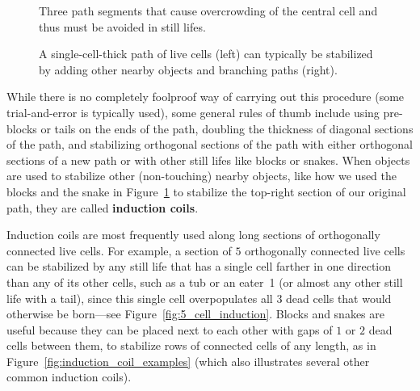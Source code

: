 \begin{figure}[!htb]
	\centering
	\begin{minipage}{.31\textwidth}
		\centering
		\caption{Three path segments that cause overcrowding of the central cell and thus must be avoided in still lifes.}
		\label{fig:invalid_path}
	\end{minipage} \quad %
	\begin{minipage}{.64\textwidth}
		\centering
		\caption{A single-cell-thick path of live cells (left) can typically be stabilized by adding other nearby objects and branching paths (right).}
		\label{fig:still_life_path}
	\end{minipage}
\end{figure}

While there is no completely foolproof way of carrying out this procedure (some trial-and-error is typically used), some general rules of thumb include using pre-blocks or tails on the ends of the path, doubling the thickness of diagonal sections of the path, and stabilizing orthogonal sections of the path with either orthogonal sections of a new path or with other still lifes like blocks or snakes. When objects are used to stabilize other (non-touching) nearby objects, like how we used the blocks and the snake in Figure~\ref{fig:still_life_path} to stabilize the top-right section of our original path, they are called \textbf{induction coils}.

Induction coils are most frequently used along long sections of orthogonally connected live cells. For example, a section of $5$ orthogonally connected live cells can be stabilized by any still life that has a single cell farther in one direction than any of its other cells, such as a tub or an eater~1 (or almost any other still life with a tail), since this single cell overpopulates all $3$ dead cells that would otherwise be born---see Figure~\ref{fig:5_cell_induction}. Blocks and snakes are useful because they can be placed next to each other with gaps of $1$ or $2$ dead cells between them, to stabilize rows of connected cells of any length, as in Figure~\ref{fig:induction_coil_examples} (which also illustrates several other common induction coils).

